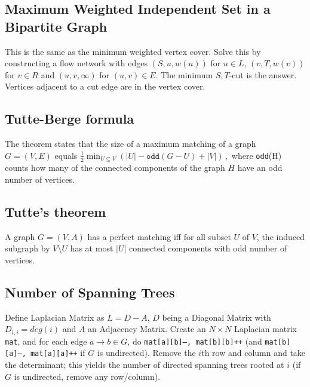 \subsection{Maximum Weighted Independent Set in a Bipartite Graph}
This is the same as the minimum weighted vertex cover. Solve this by
constructing a flow network with edges $(S,u,w(u))$ for $u\in L$,
$(v,T,w(v))$ for $v\in R$ and $(u,v,\infty)$ for $(u,v)\in E$. The
minimum $S,T$-cut is the answer. Vertices adjacent to a cut edge are
in the vertex cover.

\subsection{Tutte-Berge formula}
The theorem states that the size of a maximum matching of a graph $G=(V,E)$ equals ${\frac {1}{2}}\min_{U\subseteq V}\left(|U|- \texttt{odd}(G-U)+|V|\right)\,,$ where \texttt{odd}(H) counts how many of the connected components of the graph $H$ have an odd number of vertices.

\subsection{Tutte's theorem}
A graph $G = (V, A)$ has a perfect matching iff for all subset $U$ of $V$, the induced subgraph by $V \setminus U$ has at most $|U|$ connected components with odd number of vertices.


\subsection{Number of Spanning Trees}
		Define Laplacian Matrix as $L = D - A$, $D$ being a Diagonal Matrix with $D_{i,i} = deg(i)$ and $A$ an Adjacency Matrix.
		Create an $N\times N$ Laplacian matrix \texttt{mat}, and for each edge $a \rightarrow b \in G$, do
		\texttt{mat[a][b]--, mat[b][b]++} (and \texttt{mat[b][a]--, mat[a][a]++} if $G$ is undirected).
		Remove the $i$th row and column and take the determinant; this yields the number of directed spanning trees rooted at $i$
		(if $G$ is undirected, remove any row/column).

